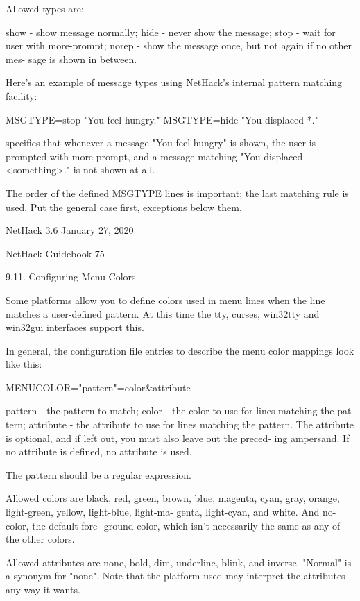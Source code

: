 \documentclass[11pt]{article}
\begin{document}
Allowed types are:

show - show message normally;
hide - never show the message;
stop - wait for user with more-prompt;
norep - show the message once, but not again if no other mes-
    sage is shown in between.

Here's an example of message types using NetHack's internal
pattern matching facility:

MSGTYPE=stop "You feel hungry."
MSGTYPE=hide "You displaced *."

specifies that whenever a message "You feel hungry" is shown,
the user is prompted with more-prompt, and a message matching
"You displaced <something>." is not shown at all.

The order of the defined MSGTYPE lines is important; the last
matching rule is used. Put the general case first, exceptions
below them.





NetHack 3.6                   January 27, 2020





NetHack Guidebook                       75



9.11. Configuring Menu Colors

   Some platforms allow you to define colors used in menu lines
when the line matches a user-defined pattern. At this time the
tty, curses, win32tty and win32gui interfaces support this.

   In general, the configuration file entries to describe the
menu color mappings look like this:

MENUCOLOR="pattern"=color\&attribute

pattern  - the pattern to match;
color   - the color to use for lines matching the pat-
      tern;
attribute - the attribute to use for lines matching the
      pattern. The attribute is optional, and if
      left out, you must also leave out the preced-
      ing ampersand.  If no attribute is defined,
      no attribute is used.

The pattern should be a regular expression.

Allowed colors are black, red, green, brown, blue, magenta,
cyan, gray, orange, light-green, yellow, light-blue, light-ma-
genta, light-cyan, and white. And no-color, the default fore-
ground color, which isn't necessarily the same as any of the
other colors.

Allowed attributes are none, bold, dim, underline, blink, and
inverse.  "Normal" is a synonym for "none". Note that the
platform used may interpret the attributes any way it wants.
\end{document}
